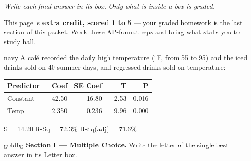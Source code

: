 \documentclass[12pt]{article}
\begin{document}
{\small\itshape Write each final answer in its box. Only what is inside a box is graded.}\par

\vspace{0.08in}

\boxguard[8]
\begin{remindbox}
\small
This page is \textbf{extra credit, scored 1 to 5} --- your graded homework is the last section
of this packet. Work these AP-format reps and bring what stalls you to study hall.
\end{remindbox}

\vspace{0.10in}

\boxguard[20]
\begin{scenariobox}{navy}
\small
A caf\'e recorded the daily high temperature ($^\circ$F, from 55 to 95) and the iced drinks sold
on 40 summer days, and regressed drinks sold on temperature:
\par\vspace{2pt}
{\centering\footnotesize\ttfamily
\begin{tabular}{@{} l r r r r @{}}
Predictor & Coef & SE Coef & T & P \\ \hline
Constant & $-$42.50 & 16.80 & $-$2.53 & 0.016 \\
Temp & 2.350 & 0.236 & 9.96 & 0.000 \\
\end{tabular}\par
S = 14.20 \quad R-Sq = 72.3\% \quad R-Sq(adj) = 71.6\%\par}
\end{scenariobox}

\vspace{0.08in}

\boxguard[12]
\begin{headlinebox}{goldbg}
\small
\textbf{Section I --- Multiple Choice.} Write the letter of the single best answer in its Letter box.
\end{headlinebox}
\end{document}
